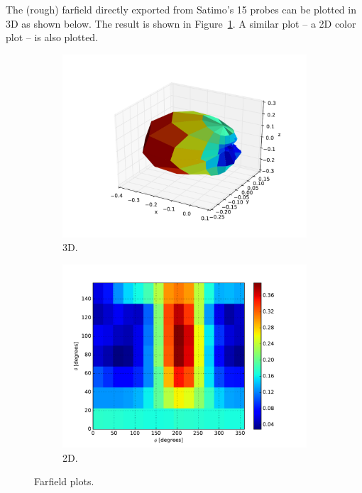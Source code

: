 \documentclass[10pt]{article}
\begin{document}
The (rough) farfield directly exported from Satimo's 15 probes can be plotted in 3D as shown below. The result is shown in Figure~\ref{fig:example2}. A similar plot -- a 2D color plot -- is also plotted.

\begin{figure}[htbp]
    \centering
    \begin{subfigure}{0.49\linewidth}
        \centering
        \includegraphics[scale=0.5]{examples/ex2_3dfarfield.pdf}
        \caption{3D.}
    \end{subfigure}
    \hfill
    \begin{subfigure}{0.49\linewidth}
        \centering
        \includegraphics[scale=0.5]{examples/ex2_2dfarfield.pdf}
        \caption{2D.}
    \end{subfigure}
    \caption{Farfield plots.}
    \label{fig:example2}
\end{figure}
\end{document}
